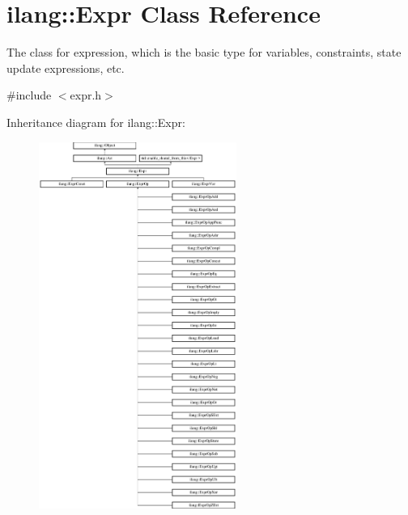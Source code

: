 \hypertarget{classilang_1_1_expr}{}\section{ilang\+:\+:Expr Class Reference}
\label{classilang_1_1_expr}


The class for expression, which is the basic type for variables, constraints, state update expressions, etc.  




{\ttfamily \#include $<$expr.\+h$>$}

Inheritance diagram for ilang\+:\+:Expr\+:\begin{figure}[H]
\begin{center}
\leavevmode
\includegraphics[height=12.000000cm]{classilang_1_1_expr}
\end{center}
\end{figure}
